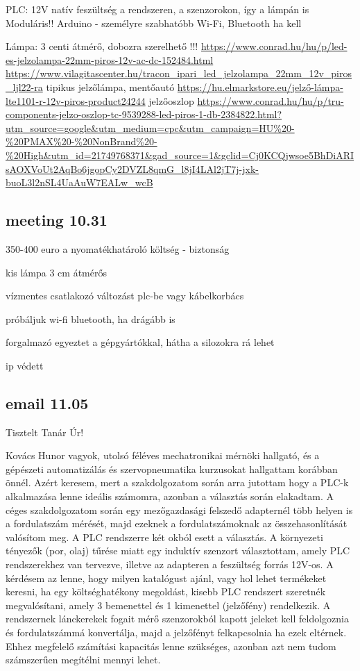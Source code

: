 \documentclass{article}
\begin{document}
	PLC: 12V
	natív feszültség a rendszeren, a szenzorokon, így a lámpán is
	Moduláris!!
	Arduino - személyre szabhatóbb
	Wi-Fi, Bluetooth ha kell
	
	Lámpa:
	3 centi átmérő, dobozra szerelhető !!!
	\url{https://www.conrad.hu/hu/p/led-es-jelzolampa-22mm-piros-12v-ac-dc-152484.html}
	\url{https://www.vilagitascenter.hu/tracon_ipari_led_jelzolampa_22mm_12v_piros_ljl22-ra}
	tipikus jelzőlámpa, mentőautó 
	\url{https://hu.elmarkstore.eu/jelző-lámpa-lte1101-r-12v-piros-product24244}
	jelzőoszlop \url{https://www.conrad.hu/hu/p/tru-components-jelzo-oszlop-tc-9539288-led-piros-1-db-2384822.html?utm_source=google&utm_medium=cpc&utm_campaign=HU%20-%20PMAX%20-%20NonBrand%20-%20High&utm_id=21749768371&gad_source=1&gclid=Cj0KCQjwsoe5BhDiARIsAOXVoUt2AqBo6jgopCy2DVZL8qmG_l8jI4LAl2jT7j-jxk-buoL3l2nSL4UaAuW7EALw_wcB}
	
	
	\subsection{meeting 10.31}
	
	350-400 euro a nyomatékhatároló
	költség - biztonság
	
	kis lámpa 3 cm átmérős 
	
	vízmentes csatlakozó változást
	plc-be vagy kábelkorbács
	
	próbáljuk wi-fi bluetooth, ha drágább is
	
	forgalmazó egyeztet a gépgyártókkal, hátha a silozokra rá lehet
	
	ip védett
	
	\subsection{email 11.05}
	
	Tisztelt Tanár Úr!
	
	Kovács Hunor vagyok, utolsó féléves mechatronikai mérnöki hallgató, és a gépészeti automatizálás és szervopneumatika kurzusokat hallgattam korábban önnél. Azért keresem, mert a szakdolgozatom során arra jutottam hogy a PLC-k alkalmazása lenne ideális számomra, azonban a választás során elakadtam.
	A céges szakdolgozatom során egy mezőgazdasági felszedő adapternél több helyen is a fordulatszám mérését, majd ezeknek a fordulatszámoknak az összehasonlítását valósítom meg. A PLC rendszerre két okból esett a választás. A környezeti tényezők (por, olaj) tűrése miatt egy induktív szenzort választottam, amely PLC rendszerekhez van tervezve, illetve az adapteren a feszültség forrás 12V-os.
	A kérdésem az lenne, hogy milyen katalógust ajánl, vagy hol lehet termékeket keresni, ha egy költséghatékony megoldást, kisebb PLC rendszert szeretnék megvalósítani, amely 3 bemenettel és 1 kimenettel (jelzőfény) rendelkezik. 
	A rendszernek lánckerekek fogait mérő szenzorokból kapott jeleket kell feldolgoznia és fordulatszámmá konvertálja, majd a jelzőfényt felkapcsolnia ha ezek eltérnek. Ehhez megfelelő számítási kapacitás lenne szükséges, azonban azt nem tudom számszerűen megítélni mennyi lehet.
\end{document}
